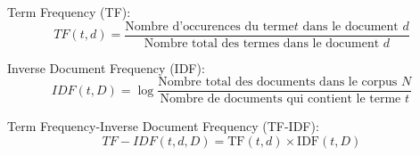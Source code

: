 \documentclass{report}
\begin{document}
Term Frequency (TF):
\[
TF(t, d) = \frac{\text{Nombre d'occurences du terme} t \text{ dans le document } d}{\text{Nombre total des termes dans le document } d}
\]

Inverse Document Frequency (IDF):
\[
IDF(t, D) = \log\frac{\text{Nombre total des documents dans le corpus } N}{\text{Nombre de documents qui contient le terme } t}
\]

Term Frequency-Inverse Document Frequency (TF-IDF):
\[
TF-IDF(t, d, D) = \text{TF}(t, d) \times \text{IDF}(t, D)
\]
\end{document}
